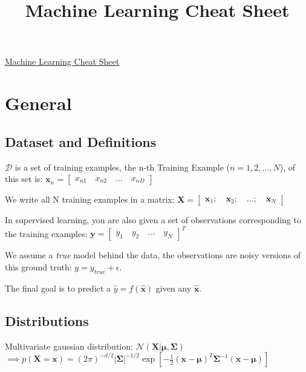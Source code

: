 \documentclass[10pt,a4paper,landscape]{article}
\providecommand{\bf}[1]{\ensuremath{\mathbf{#1}}}
\begin{document}
\title{Machine Learning Cheat Sheet}

\raggedright
\footnotesize
\sffamily
\begin{multicols*}{4}

\setlength{\premulticols}{1pt}
\setlength{\postmulticols}{1pt}
\setlength{\multicolsep}{1pt}
\setlength{\columnsep}{2pt}

\begin{center}
\Large{\underline{Machine Learning Cheat Sheet}}
\end{center}

\section{General}
\subsection{Dataset and Definitions}
$\mathcal{D}$ is a set of training examples, the n-th Training Example ($n = 1,2, ..., N$), of this set is: $\bf{x}_n = \begin{bmatrix} x_{n1} \quad x_{n2} \quad ... \quad x_{nD} \end{bmatrix} $

We write all N training examples in a matrix: $\bf{X} = \begin{bmatrix} \bf{x}_1 ; \quad \bf{x}_2 ; \quad ... ; \quad \bf{x}_N \end{bmatrix}$

In supervised learning, you are also given a set of observations corresponding to the training examples:  $\bf{y} = \begin{bmatrix} y_1 \quad y_2 \quad ... \quad y_{N} \end{bmatrix}^T$

We assume a \emph{true} model behind the data, the observations are noisy versions of this ground truth: $y = y_{true} + \epsilon$.

The final goal is to predict a $\hat{y} = f(\bf{\hat{x}})$ given any $\bf{\hat{x}}$.

\subsection{Distributions}
Multivariate gaussian distribution: $\mathcal{N}(\bf{X} | \bf{\mu} , \bf{\Sigma})$ \\
$\implies p(\bf{X} = \bf{x}) = (2 \pi)^{-d/2} |\bf{\Sigma|}^{-1/2} \exp{[- \frac{1}{2} (\bf{x} - \bf{\mu})^T \bf{\Sigma}^{-1} (\bf{x} - \bf{\mu})]}$


\end{multicols*}
\end{document}
